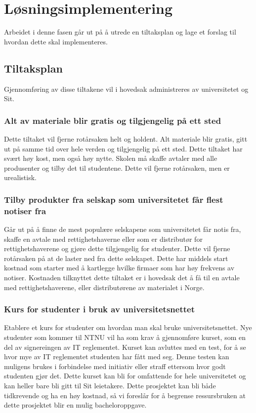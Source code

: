 \section{Løsningsimplementering}
Arbeidet i denne fasen går ut på å utrede en tiltaksplan og lage et forslag til hvordan dette skal implementeres.

\subsection{Tiltaksplan}
Gjennomføring av disse tiltakene vil i hovedsak administreres av universitetet og Sit.

\subsubsection{Alt av materiale blir gratis og tilgjengelig på ett sted}
Dette tiltaket vil fjerne rotårsaken helt og holdent. Alt materiale blir gratis, gitt ut på samme tid over hele verden og tilgjengelig på ett sted. Dette tiltaket har svært høy kost, men også høy nytte. Skolen må skaffe avtaler med alle produsenter og tilby det til studentene. Dette vil fjerne rotårsaken, men er urealistisk. 

\subsubsection{Tilby produkter fra selskap som universitetet får flest notiser fra}
Går ut på å finne de mest populære selskapene som universitetet får notis fra, skaffe en avtale med rettighetshaverne eller som er distributør for rettighetshaverene og gjøre dette tilgjengelig for studenter. Dette vil fjerne rotårsaken på at de laster ned fra dette selskapet. Dette har middels start kostnad som starter med å kartlegge hvilke firmaer som har høy frekvens av notiser. Kostnaden tilknyttet dette tiltaket er i hovedsak det å få til en avtale med rettighetshaverene, eller distributørene av materialet i Norge.

\subsubsection{Kurs for studenter i bruk av universitetsnettet}
Etablere et kurs for studenter om hvordan man skal bruke universitetsnettet. Nye studenter som kommer til NTNU vil ha som krav å gjennomføre kurset, som en del av signereingen av IT reglementet. Kurset kan avluttes med en test, for å se hvor mye av IT reglementet studenten har fått med seg. Denne testen kan muligens brukes i forbindelse med initiativ eller straff ettersom hvor godt studenten gjør det. Dette kurset kan bli for omfattende for hele universitetet og kan heller bare bli gitt til Sit leietakere. Dette prosjektet kan bli både tidkrevende og ha en høy kostnad, så vi foreslår for å begrense ressursbruken at dette prosjektet blir en mulig bacheloroppgave. 


